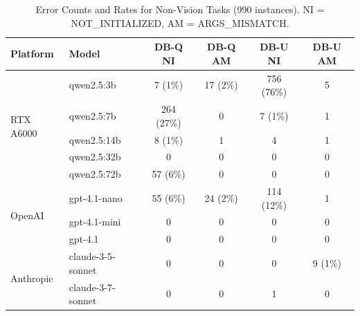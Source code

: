 \begin{table}[htbp]
\centering
\caption{Error Counts and Rates for Vision Tasks (990 instances). NI = NOT\_INITIALIZED, AM = ARGS\_MISMATCH.}
\label{tab:asr_error_vision}
\small
{}
\end{table}

\begin{table}[htbp]
\centering
\caption{Error Counts and Rates for Non-Vision Tasks (990 instances). NI = NOT\_INITIALIZED, AM = ARGS\_MISMATCH.}
\label{tab:asr_error_nonvision}
\small
\begin{tabular}{@{}ll|cc|cc@{}}
\toprule
\textbf{Platform} & \textbf{Model} & \textbf{DB-Q NI} & \textbf{DB-Q AM} & \textbf{DB-U NI} & \textbf{DB-U AM} \\
\midrule
\multirow{5}{*}{RTX A6000} 
 & qwen2.5:3b & 7 (1\%) & 17 (2\%) & 756 (76\%) & 5 \\
 & qwen2.5:7b & 264 (27\%) & 0 & 7 (1\%) & 1 \\
 & qwen2.5:14b & 8 (1\%) & 1 & 4 & 1 \\
 & qwen2.5:32b & 0 & 0 & 0 & 0 \\
 & qwen2.5:72b & 57 (6\%) & 0 & 0 & 0 \\
\midrule
\multirow{3}{*}{OpenAI} 
 & gpt-4.1-nano & 55 (6\%) & 24 (2\%) & 114 (12\%) & 1 \\
 & gpt-4.1-mini & 0 & 0 & 0 & 0 \\
 & gpt-4.1 & 0 & 0 & 0 & 0 \\
\midrule
\multirow{2}{*}{Anthropic} 
 & claude-3-5-sonnet & 0 & 0 & 0 & 9 (1\%) \\
 & claude-3-7-sonnet & 0 & 0 & 1 & 0 \\
\bottomrule
\end{tabular}
\end{table}

